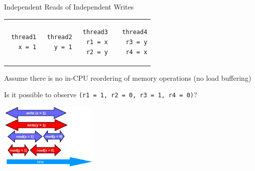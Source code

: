 \begin{frame}[t,fragile]{Independent Reads of Independent Writes}
 
 \begin{tabular}{p{} p{} p{} p{}}
 \begin{verbatim}
 thread1
   x = 1
 \end{verbatim}
 
 & 
 
 \begin{verbatim}
 thread2
   y = 1
 \end{verbatim}
 
 &
 
 \begin{verbatim}
 thread3
  r1 = x
  r2 = y 
 \end{verbatim}
 
 &
 
 \begin{verbatim}
 thread4
  r3 = y
  r4 = x
 \end{verbatim}
 \end{tabular}
 
 Assume there is no in-CPU reordering of memory operations (no load buffering)
 
 \pause
Is it possible to observe \texttt{(r1 = 1, r2 = 0, r3 = 1, r4 = 0)}?

\pause

\begin{center}
 \includegraphics[width=0.35\textwidth]{./pics/iriw.png}
\end{center}

\end{frame}


